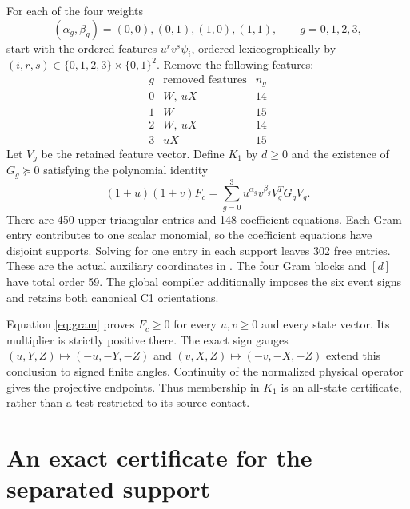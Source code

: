 \documentclass[11pt]{article}
\begin{document}
For each of the four weights
\[
 (\alpha_g,\beta_g)=(0,0),(0,1),(1,0),(1,1),
 \qquad g=0,1,2,3,
\]
start with the ordered features $u^rv^s\psi_i$, ordered lexicographically
by $(i,r,s)\in\{0,1,2,3\}\times\{0,1\}^2$.
Remove the following features:
\[
\begin{array}{c|c|c}
 g&\text{removed features}&n_g\\\hline
 0&W,\ uX&14\\
 1&W&15\\
 2&W,\ uX&14\\
 3&uX&15
\end{array}
\]
Let $V_g$ be the retained feature vector.  Define $K_1$ by
$d\geq0$ and the existence of $G_g\succeq0$ satisfying the polynomial
identity
\begin{equation}
 (1+u)(1+v)F_c
  =\sum_{g=0}^3u^{\alpha_g}v^{\beta_g}V_g^TG_gV_g.
 \label{eq:gram}
\end{equation}
There are 450 upper-triangular entries and 148 coefficient equations.
Each Gram entry contributes to one scalar monomial, so the coefficient
equations have disjoint supports.  Solving for one entry in each support
leaves 302 free entries.  These are the actual auxiliary coordinates in
.  The four Gram blocks and $[d]$
have total order 59.  The global compiler additionally imposes the six
event signs and retains both canonical C1 orientations.

Equation \eqref{eq:gram} proves $F_c\geq0$ for every $u,v\geq0$ and every
state vector.  Its multiplier is strictly positive there.  The exact sign
gauges $(u,Y,Z)\mapsto(-u,-Y,-Z)$ and
$(v,X,Z)\mapsto(-v,-X,-Z)$ extend this conclusion to signed finite angles.
Continuity of the normalized physical operator gives the projective
endpoints.  Thus membership in $K_1$ is an all-state certificate, rather
than a test restricted to its source contact.

\section{An exact certificate for the separated support}
\end{document}
